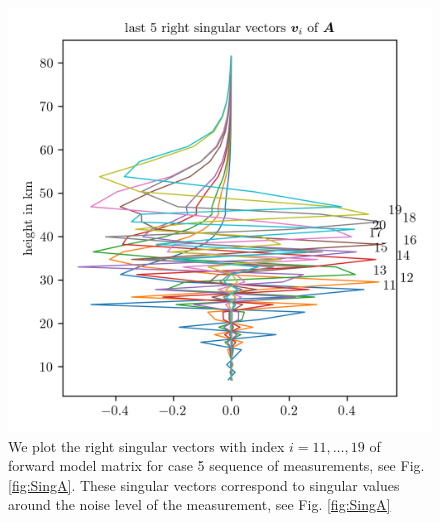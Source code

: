 \begin{figure}[ht!]
	\centering
	\includegraphics{MiddleVecA.png}
	\caption[Right singular vectors 11 to 19 of forward model.]{We plot the right singular vectors with index $i = 11,\dots, 19$ of forward model matrix for case 5 sequence of measurements, see Fig. \ref{fig:SingA}.
    These singular vectors correspond to singular values around the noise level of the measurement, see Fig. \ref{fig:SingA}}
	\label{fig:middleSpace}
\end{figure}
